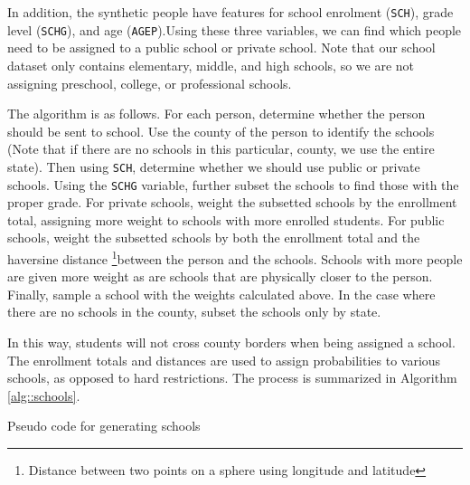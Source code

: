 \documentclass{article}
\begin{document}
		In addition, the synthetic people have features for school enrolment (\texttt{SCH}), grade level (\texttt{SCHG}), and age (\texttt{AGEP}).Using these three variables, we can find which people need to be assigned to a public school or private school. Note that our school dataset only contains elementary, middle, and high schools, so we are not assigning preschool, college, or professional schools. 

		The algorithm is as follows.  For each person, determine whether the person should be sent to school. Use the county of the person to identify the  schools (Note that if there are no schools in this particular, county, we use the entire state). Then using \texttt{SCH}, determine whether we should use public or private schools. Using the \texttt{SCHG} variable, further subset the schools to find those with the proper grade.  For private schools, weight the subsetted schools by the enrollment total, assigning more weight to schools with more enrolled students.  For public schools, weight the subsetted schools by both the enrollment total and the haversine distance \footnote{Distance between two points on a sphere using longitude and latitude}between the person and the schools.  Schools with more people are given more weight as are schools that are physically closer to the person.  Finally, sample a school with the weights calculated above.  In the case where there are no schools in the county, subset the schools only by state.

		In this way, students will not cross county borders when being assigned a school. The enrollment totals and distances are used to assign probabilities to various schools, as opposed to hard restrictions. The process is summarized in Algorithm \ref{alg::schools}. \\

		\begin{algorithm}[H]
                  \label{alg::schools}
			\SetAlgoLined
                        \caption{Pseudo code for generating schools}
		\end{algorithm}
\end{document}
